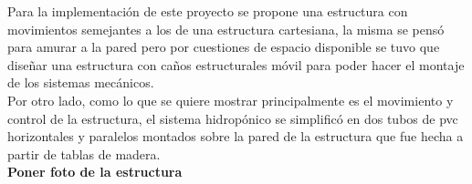 Para la implementación de este proyecto se propone una estructura con movimientos semejantes a los de una estructura cartesiana, la misma se pensó para amurar a la pared pero por cuestiones de espacio disponible se tuvo que diseñar una estructura con caños estructurales móvil para poder hacer el montaje de los sistemas mecánicos.\\
Por otro lado, como lo que se quiere mostrar principalmente es el movimiento y control de la estructura, el sistema hidropónico se simplificó en dos tubos de pvc horizontales y paralelos montados sobre la pared de la estructura que fue hecha a partir de tablas de madera.\\
\textbf{Poner foto de la estructura}